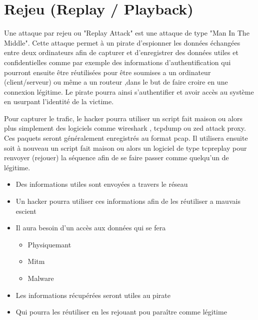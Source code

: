 

\newpage
\section{Rejeu (Replay / Playback)}\label{vulnerabilites:reseau:replay}

Une attaque par rejeu ou "Replay Attack" est une attaque de type "Man In The Middle". Cette attaque permet à un pirate d'espionner les données échangées entre deux ordinateurs afin de capturer et d'enregistrer des données utiles et confidentielles comme par exemple des informations d'authentification qui pourront ensuite être réutilisées pour être soumises a un ordinateur (client/serveur) ou même a un routeur ,dans le but de faire croire en une connexion légitime. Le pirate pourra ainsi s'authentifier et avoir accès au système en usurpant l'identité de la victime.

\begin{flushleft}
Pour capturer le trafic, le hacker pourra utiliser un script fait maison ou alors plus simplement des logiciels comme wireshark , tcpdump ou zed attack proxy. Ces paquets seront généralement enregistrés au format pcap. Il utilisera ensuite soit à nouveau un script fait maison ou alors un logiciel de type tcpreplay pour renvoyer (rejouer) la séquence afin de se faire passer comme quelqu'un de légitime.
\end{flushleft}

\bigskip

\begin{itemize}
\item Des informations utiles sont envoyées a travers le réseau
\item Un hacker pourra utiliser ces informations afin de les réutiliser a mauvais escient
\item Il aura besoin d'un accès aux données qui se fera
\begin{itemize}
\item Physiquemant
\item Mitm 
\item Malware
\end{itemize}
\item Les informations récupérées seront utiles au pirate
\item Qui pourra les réutiliser en les rejouant pou paraître comme légitime
\end{itemize}

